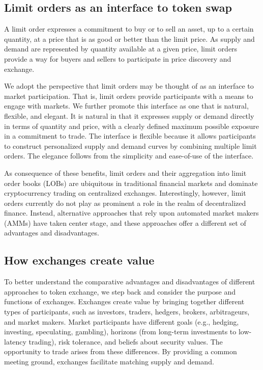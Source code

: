 \documentclass[11pt, reqno]{amsart}
\theoremstyle{definition}
\theoremstyle{remark}
\begin{document}
\subsection{Limit orders as an interface to token swap}
A limit order expresses a commitment to buy or to sell an asset, up to
a certain quantity, at a price that is as good or better than the limit price.
As supply and demand are represented by quantity available at a given price,
limit orders provide a way for buyers and sellers to participate in price
discovery and exchange.

We adopt the perspective that limit orders may be thought of as an interface
to market participation. That is, limit orders provide participants with a
means to engage with markets. We further promote this interface as one that
is natural, flexible, and elegant. It is natural in that it expresses
supply or demand directly in terms of quantity and price, with a clearly
defined maximum possible exposure in a commitment to trade. The interface is
flexible because it allows participants to construct personalized supply and
demand curves by combining multiple limit orders. The elegance follows from the
simplicity and ease-of-use of the interface.

As consequence of these benefits, limit orders and their aggregation into limit order books (LOBs)
are ubiquitous in traditional financial markets
and dominate cryptocurrency trading on centralized exchanges. Interestingly,
however, limit orders currently do not play as prominent a role in the realm of
decentralized finance. Instead, alternative approaches that rely upon
automated market makers (AMMs) have taken center stage, and these approaches
offer a different set of advantages and disadvantages.

\subsection{How exchanges create value}
To better understand the comparative advantages and disadvantages of different
approaches to token exchange, we step back and consider the purpose and
functions of exchanges.
Exchanges create value by bringing together different types of participants,
such as investors, traders, hedgers, brokers, arbitrageurs, and market makers.
Market participants have different goals (e.g., hedging, investing,
speculating, gambling), horizons (from long-term investments to low-latency
trading), risk tolerance, and beliefs about security values. The opportunity to
trade arises from these differences.
By providing a common meeting ground, exchanges facilitate matching supply
and demand.
\end{document}

